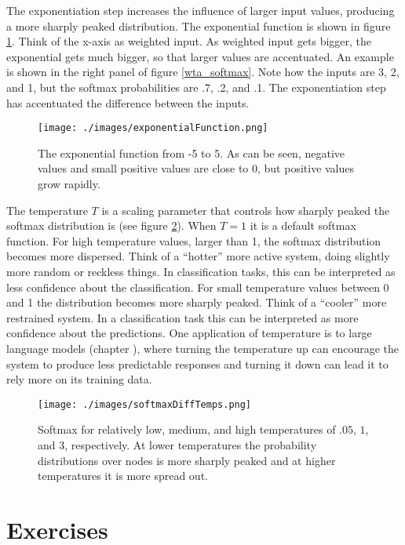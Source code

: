 The exponentiation step increases the influence of larger input values, producing a more sharply peaked distribution. The exponential function is shown in figure \ref{exponentiation}. Think of the x-axis as weighted input. As weighted input gets bigger, the exponential gets much bigger, so that larger values are accentuated. An example is shown in the right panel of figure \ref{wta_softmax}. Note how the inputs are 3, 2, and 1, but the softmax probabilities are .7, .2, and .1. The exponentiation step has accentuated the difference between the inputs.

\begin{figure}[h]
\centering
\texttt{[image: ./images/exponentialFunction.png]}
\caption[Jeff Yoshimi using Wolfram Alpha.]{The exponential function from -5 to 5. As can be seen, negative values and small positive values are close to 0, but positive values grow rapidly.}
\label{exponentiation}
\end{figure}

The temperature $T$ is a scaling parameter that controls how sharply peaked the softmax distribution is (see figure \ref{softmaxTemps}). When $T=1$ it is a default softmax function.  For high temperature values, larger than 1, the softmax distribution becomes more dispersed. Think of a ``hotter'' more active system, doing slightly more random or reckless things. In classification tasks, this can be interpreted as less confidence about the classification.  For small temperature values between 0 and 1 the distribution becomes more sharply peaked. Think of a ``cooler'' more restrained system. In a classification task this can be interpreted as more confidence about the predictions.  One application of temperature is to large language models (chapter ), where turning the temperature up can encourage the system to produce less predictable responses and turning it down can lead it to rely more on its training data.

\begin{figure}[h]
\centering
\texttt{[image: ./images/softmaxDiffTemps.png]}
\caption[Jeff Yoshimi.]{Softmax for relatively low, medium, and high temperatures of $.05$, $1$, and $3$, respectively. At lower temperatures the probability distributions over nodes is more sharply peaked and at higher temperatures it is more spread out.}
\label{softmaxTemps}
\end{figure}

\section{Exercises}\label{activation_function_exercises}

